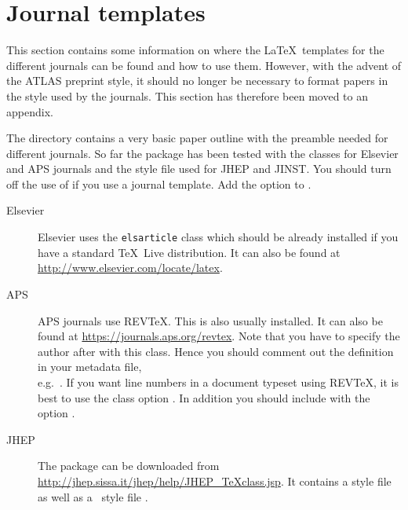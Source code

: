 \appendix
\section{Journal templates}
\label{sec:journal}

This section contains some information on where the \LaTeX\ templates for the different journals can be found and how to use them.
However, with the advent of the ATLAS preprint style, 
it should no longer be necessary to format papers in the style used by the journals.
This section has therefore been moved to an appendix.

The directory  contains a very basic paper outline with the preamble needed for different journals.
So far the  package has been tested with the classes for Elsevier and APS journals and the style file used for JHEP and JINST.
You should turn off the use of  if you use a journal template.
Add the option  to .

\begin{description}
\item[Elsevier]Elsevier uses the \texttt{elsarticle} class which should be already installed if you have a standard 
  \TeX\ Live distribution. 
  It can also be found at \url{http://www.elsevier.com/locate/latex}.
  
\item[APS]APS journals use REV\TeX. This is also usually installed.
  It can also be found at \url{https://journals.aps.org/revtex}.
  Note that you have to specify the author after \verb|| with this class.
  Hence you should comment out the definition in your metadata file,\\
  e.g.\ .
  If you want line numbers in a document typeset using REV\TeX, it is best to use the class option .
  In addition you should include  with the option .
  
\item[JHEP]The package can be downloaded from \url{http://jhep.sissa.it/jhep/help/JHEP_TeXclass.jsp}. It contains a style file  as well as a \BibTeX\ style file . 
\end{description}


